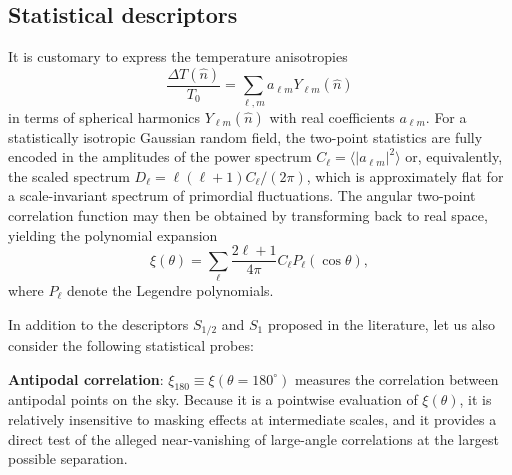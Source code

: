 \documentclass[apj,twocolumn,numberedappendix]{openjournal}
\begin{document}
\subsection{Statistical descriptors}


It is customary to express the temperature anisotropies
\begin{equation}
	\frac{\Delta T(\hat{n})}{T_0} = \sum_{\ell,m} a_{\ell m} Y_{\ell m}(\hat{n})
\end{equation}
in terms of spherical harmonics $Y_{\ell m}(\hat{n})$ with real coefficients $a_{\ell m}$.
For a statistically isotropic Gaussian random field, the two-point statistics are
fully encoded in the amplitudes of the power spectrum $C_\ell = \langle |a_{\ell m}|^2 \rangle$ or, equivalently, the scaled spectrum $D_\ell = \ell(\ell+1)C_\ell/(2\pi)$, which is approximately flat for a scale-invariant spectrum of primordial fluctuations.
The angular two-point correlation function may then be obtained by transforming back to real space, yielding the polynomial expansion
\begin{equation}\label{eq-corr}
\xi(\theta) = \sum_\ell \frac{2\ell+1}{4\pi} C_\ell P_\ell(\cos\theta)
,
\end{equation}
where $P_\ell$ denote the Legendre polynomials.


In addition to the descriptors $S_{1/2}$ and $S_1$ proposed in the literature, let us also consider the following statistical probes:

\textbf{Antipodal correlation}:
$\xi_{180} \equiv \xi(\theta = 180^{\circ})$ measures the correlation between antipodal points on the sky.
Because it is a pointwise evaluation of $\xi(\theta)$, it is relatively insensitive to masking effects at intermediate scales, and it provides a direct test of the alleged near-vanishing of large-angle correlations at the largest possible separation.
\end{document}
